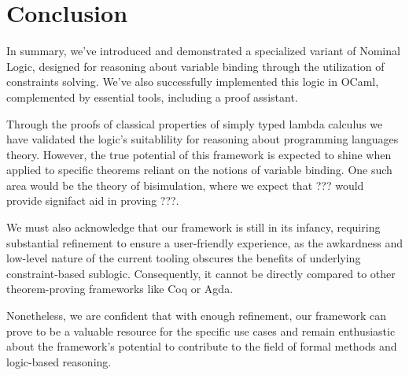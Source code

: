 \documentclass[english, mgr]{iithesis}
\begin{document}
\chapter{Conclusion}

In summary, we've introduced and demonstrated a specialized variant of Nominal Logic,
designed for reasoning about variable binding
through the utilization of constraints solving.
We've also successfully implemented this logic in OCaml,
complemented by essential tools, including a proof assistant.

Through the proofs of classical properties of simply typed lambda calculus
we have validated the logic's suitablility for reasoning about
programming languages theory.
However, the true potential of this framework is expected to shine when applied to
specific theorems reliant on the notions of variable binding.
One such area would be the theory of bisimulation, where we expect that ???
would provide signifact aid in proving ???.

We must also acknowledge that our framework is still in its infancy,
requiring substantial refinement to ensure a user-friendly experience, as the
awkardness and low-level nature of the current tooling obscures the benefits
of underlying constraint-based sublogic.
Consequently, it cannot be directly compared to other theorem-proving frameworks like Coq or Agda.

Nonetheless, we are confident that with enough refinement,
our framework can prove to be a valuable resource for the specific use cases and
remain enthusiastic about the framework's potential to
contribute to the field of formal methods and logic-based reasoning.


\printbibliography
\end{document}
